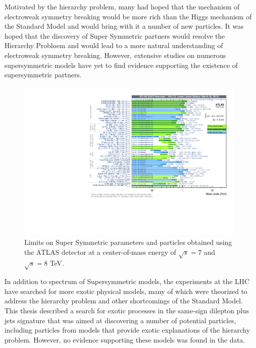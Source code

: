 Motivated by the hierarchy problem, many had hoped that the mechanism of electroweak
symmetry breaking would be more rich than the Higgs mechanism of the Standard Model and
would bring with it a number of new particles.
It was hoped that the discovery of Super Symmetric partners would resolve the
Hierarchy Probloem and would lead to a more natural understanding of electroweak symmetry breaking.
However, extensive studies on numerous supersymmetric models have yet to find evidence
supporting the existence of supersymmetric partners.

\begin{figure}[ht!]
  \begin{center}
    \includegraphics[width=.75\textwidth]{figures/conclusion/Susy}
    \caption{Limits on Super Symmetric parameters and particles obtained using the ATLAS detector at a center-of-mass energy of $\sqrt{s}=7$ and $\sqrt{s} = 8$ TeV.}
    \label{fig:susy}
  \end{center}
\end{figure}

In addition to spectrum of Supersymmetric models, the experiments at the LHC have searched
for more exotic physical models, many of which were theorized to address the hierarchy
problem and other shortcomings of the Standard Model.
This thesis described a search for exotic processes in the same-sign dilepton plus jets signature that
was aimed at discovering a number of potential particles, including particles from models that provide
exotic explanations of the hierarchy problem.
However, no evidence supporting these models was found in the data.

